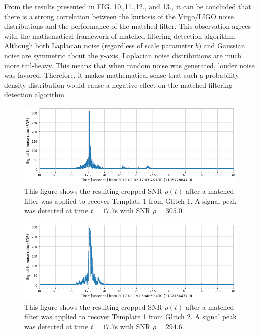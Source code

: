 \documentclass[preprint,
letterpaper,
 amsmath,amssymb,
 aps,
]{revtex4-2}
\begin{document}
From the results presented in FIG. 10.,11.,12., and 13., it can be concluded that there is a strong correlation between the kurtosis of the Virgo/LIGO noise distributions and the performance of the matched filter. This observation agrees with the mathematical framework of matched filtering detection algorithm. Although both Laplacian noise (regardless of scale parameter $b$) and Gaussian noise are symmetric about the y-axis, Laplacian noise distributions are much more tail-heavy. This means that when random noise was generated, louder noise was favored. Therefore, it makes mathematical sense that such a probability density distribution would cause a negative effect on the matched filtering detection algorithm.

\begin{figure}[t]
\caption{This figure shows the resulting cropped SNR $\rho(t)$ after a matched filter was applied to recover Template 1 from Glitch 1. A signal peak was detected at time $t = 17.7$s with SNR $\rho = 305.0$.}
\includegraphics[scale = .33]{glitch loud 69 template 1.png}
\centering
\end{figure}

\begin{figure}[t]
\caption{This figure shows the resulting cropped SNR $\rho(t)$ after a matched filter was applied to recover Template 1 from Glitch 2. A signal peak was detected at time $t = 17.7$s with SNR $\rho = 294.6$.}
\includegraphics[scale = .33]{glitch loud 02 template 1.png}
\centering
\end{figure}
\end{document}
